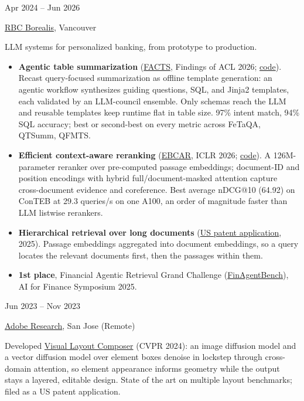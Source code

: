 \documentclass[10pt,letterpaper]{article}
\newcommand{\meta}[1]{{\ttfamily\footnotesize\color{faint}#1}}   %
\newcommand{\dates}[1]{\hfill\meta{#1}}
\newcommand{\soft}[1]{{\color{inksoft}#1}}
\newcommand{\entry}[3]{%
  \par\vspace{4pt}{\bfseries #1}\dates{#3}\par
  \soft{#2}\par\vspace{1pt}}
\begin{document}
\entry{Machine Learning Researcher}{\href{https://rbcborealis.com/}{RBC Borealis}, Vancouver}{Apr 2024 -- Jun 2026}
\small LLM systems for personalized banking, from prototype to production.
\begin{itemize}
  \item \textbf{Agentic table summarization} (\href{https://aclanthology.org/2026.findings-acl.453.pdf}{FACTS}, Findings of ACL 2026; \href{https://github.com/BorealisAI/FACTS}{code}). Recast query-focused summarization as offline template generation: an agentic workflow synthesizes guiding questions, SQL, and Jinja2 templates, each validated by an LLM-council ensemble. Only schemas reach the LLM and reusable templates keep runtime flat in table size. 97\% intent match, 94\% SQL accuracy; best or second-best on every metric across FeTaQA, QTSumm, QFMTS.
  \item \textbf{Efficient context-aware reranking} (\href{https://arxiv.org/abs/2510.13329}{EBCAR}, ICLR 2026; \href{https://github.com/BorealisAI/EBCAR}{code}). A 126M-parameter reranker over pre-computed passage embeddings; document-ID and position encodings with hybrid full/document-masked attention capture cross-document evidence and coreference. Best average nDCG@10 (64.92) on ConTEB at 29.3 queries/s on one A100, an order of magnitude faster than LLM listwise rerankers.
  \item \textbf{Hierarchical retrieval over long documents} (\href{https://patents.google.com/patent/US20260195323A1}{US patent application}, 2025). Passage embeddings aggregated into document embeddings, so a query locates the relevant documents first, then the passages within them.
  \item \textbf{1st place}, Financial Agentic Retrieval Grand Challenge (\href{https://ai4f.org/2025-challenge}{FinAgentBench}), AI for Finance Symposium 2025.
\end{itemize}\normalsize

\entry{Research Scientist/Engineer Intern}{\href{https://research.adobe.com/}{Adobe Research}, San Jose (Remote)}{Jun 2023 -- Nov 2023}
\small Developed \href{https://openaccess.thecvf.com/content/CVPR2024/html/Shabani_Visual_Layout_Composer_Image-Vector_Dual_Diffusion_Model_for_Design_Layout_CVPR_2024_paper.html}{Visual Layout Composer} (CVPR 2024): an image diffusion model and a vector diffusion model over element boxes denoise in lockstep through cross-domain attention, so element appearance informs geometry while the output stays a layered, editable design. State of the art on multiple layout benchmarks; filed as a US patent application.\normalsize
\end{document}
